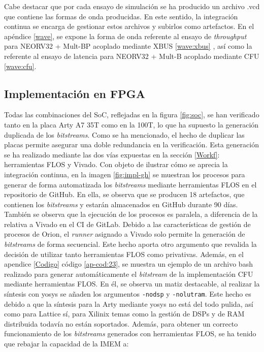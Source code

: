 \vspace{3cm}

Cabe destacar que por cada ensayo de simulación se ha producido un archivo .vcd que contiene las formas de onda producidas.
En este sentido, la integración continua se encarga de gestionar estos archivos y subirlos como artefactos.
En el apéndice \ref{wave}, se expone la forma de onda referente al ensayo de \textit{throughput} para NEORV32 + Mult-BP acoplado mediante XBUS \ref{wave:xbus} , así como la referente al ensayo de latencia para NEORV32 + Mult-B acoplado mediante CFU  \ref{wave:cfu}.

\subsection{Implementación en FPGA}


Todas las combinaciones del SoC, reflejadas en la figura \ref{fig:soc}, se han verificado tanto en la placa Arty A7 35T como en la 100T, lo que ha supuesto la generación duplicada de los \textit{bitstreams}.
Como se ha mencionado, el hecho de duplicar las placas permite asegurar una doble redundancia en la verificación.
Esta generación se ha realizado mediante las dos vías expuestas en la sección \ref{Workf}: herramientas FLOS y Vivado.
Con objeto de ilustrar cómo se aprecia la integración continua, en la imagen \ref{fig:impl-gh} se muestran los procesos para generar de forma automatizada los \textit{bitstreams} mediante herramientas FLOS en el repositorio de GitHub. 
En ella, se observa que se producen 18 artefactos, que contienen los \textit{bitstreams} y estarán almacenados en GitHub durante 90 días.
También se observa que la ejecución de los procesos es paralela, a diferencia de la relativa a Vivado en el CI de GitLab.
Debido a las características de gestión de procesos de Orion, el \textit{runner} asignado a Vivado solo permite la generación de \textit{bitstreams} de forma secuencial.
Este hecho aporta otro argumento que revalida la decisión de utilizar tanto herramientas FLOS como privativas.
Además, en el apendice \ref{Codigo} código \ref{ap-cod:23}, se muestra un ejemplo de un archivo bash realizado para generar automáticamente el \textit{bitstream} de la implementación CFU mediante herramientas FLOS.
En él, se observa un matiz destacable, al realizar la síntesis con yosys se añaden los argumentos  \texttt{-nodsp} y \texttt{-nolutram}.
Este hecho es debido a que la síntesis para la Arty mediante yosys no está del todo pulida, así como para Lattice sí, para Xilinix temas como la gestión de DSPs y de RAM distribuida todavía no están soportados.
Además, para obtener un correcto funcionamiento de los \textit{bitstreams} generados con herramientas FLOS, se ha tenido que rebajar la capacidad de la IMEM a:

